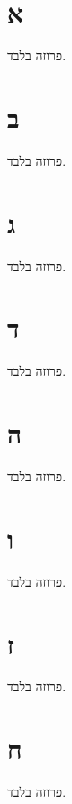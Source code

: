\chapter{א} פרוזה בלבד.
\chapter{ב} פרוזה בלבד.
\chapter{ג} פרוזה בלבד.
\chapter{ד} פרוזה בלבד.
\chapter{ה} פרוזה בלבד.
\chapter{ו} פרוזה בלבד.
\chapter{ז} פרוזה בלבד.
\chapter{ח} פרוזה בלבד.

